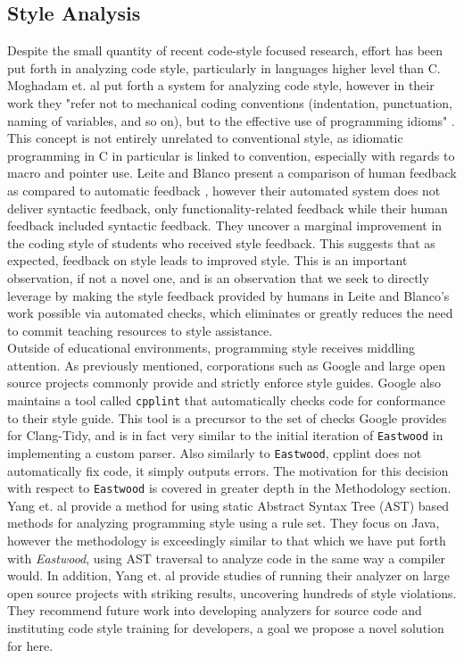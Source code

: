 \documentclass[sigconf]{acmart}
\begin{document}
\subsection{Style Analysis}

Despite the small quantity of recent code-style focused research, effort has been put
forth in analyzing code style, particularly in languages higher level than C. Moghadam
et. al put forth a system for analyzing code style, however in their work they "refer
not to mechanical coding conventions (indentation, punctuation, naming of variables, and
so on), but to the effective use of programming idioms" \cite{10.1145/2724660.2728672}.
This concept is not entirely unrelated to conventional style, as idiomatic programming
in C in particular is linked to convention, especially with regards to macro and pointer
use. Leite and Blanco present a comparison of human feedback as compared to automatic
feedback \cite{10.1145/3328778.3366921}, however their automated system does not deliver
syntactic feedback, only functionality-related feedback while their human feedback
included syntactic feedback. They uncover a marginal improvement in the coding style of
students who received style feedback. This suggests that as expected, feedback on style
leads to improved style. This is an important observation, if not a novel one, and is
an observation that we seek to directly leverage by making the style feedback provided
by humans in Leite and Blanco's work possible via automated checks, which eliminates or
greatly reduces the need to commit teaching resources to style assistance.
\\ 

Outside of educational environments, programming style receives middling attention.
As previously mentioned, corporations such as Google \cite{GoogleCStyleGuide} and large
open source projects commonly provide and strictly enforce style guides. Google also
maintains a tool called \texttt{cpplint} \cite{cpplint} that automatically checks code
for conformance to their style guide. This tool is a precursor to the set of checks
Google provides for Clang-Tidy, and is in fact very similar to the initial iteration of
\texttt{Eastwood} in implementing a custom parser. Also similarly to \texttt{Eastwood},
cpplint does not automatically fix code, it simply outputs errors. The motivation for
this decision with respect to \texttt{Eastwood} is covered in greater depth in the
Methodology section.
\\

Yang et. al provide a method for using static Abstract Syntax Tree (AST) based methods
for analyzing programming style using a rule set. They focus on Java, however the
methodology is exceedingly similar to that which we have put forth with
\textit{Eastwood}, using AST traversal to analyze code in the same way a compiler would.
In addition, Yang et. al provide studies of running their analyzer on large open source
projects with striking results, uncovering hundreds of style violations. They recommend
future work into developing analyzers for source code and instituting code style
training for developers, a goal we propose a novel solution for here.
\\
\end{document}
